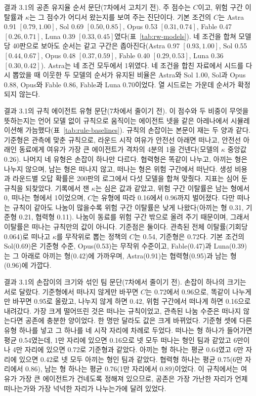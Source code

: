 결과 3.1의 공존 유지율 순서 문단(7차에서 고치기 전).
주 점수는 $C$이고, 위험 구간 이탈률과 $\kappa$는 그 점수가 어디서 왔는지를 보여 주는 진단이다. 기본 조건의 $C$는 Astra 0.91 $[0.79,1.00]$, Sol 0.69 $[0.50,0.85]$, Opus 0.53 $[0.31,0.74]$, Fable 0.47 $[0.26,0.71]$, Luna 0.39 $[0.33,0.45]$였다(표~\ref{tab:rw-models}). 네 조건을 합쳐 모델당 40판으로 보아도 순서는 같고 구간은 좁아진다(Astra 0.97 $[0.93,1.00]$, Sol 0.55 $[0.44,0.67]$, Opus 0.48 $[0.37,0.59]$, Fable 0.40 $[0.29,0.53]$, Luna 0.36 $[0.30,0.42]$). Astra는 네 조건 모두에서 1위였다. 네 조건을 합친 자료에서 시드를 다시 뽑았을 때 이웃한 두 모델의 순서가 유지된 비율은 Astra와 Sol 1.00, Sol과 Opus 0.88, Opus와 Fable 0.86, Fable과 Luna 0.70이었다. 열 시드로는 가운데 순서가 확정되지 않는다.

결과 3.1의 규칙 에이전트 유형 문단(7차에서 줄이기 전).
이 점수와 두 비중이 무엇을 뜻하는지는 언어 모델 없이 규칙으로 움직이는 에이전트 넷을 같은 아레나에서 시뮬레이션해 가늠했다(표~\ref{tab:rule-baselines}). 규칙의 손잡이는 본문이 재는 두 양과 같다. 기준형은 관측에 맞춘 규칙으로, 라운드 시작 여유가 안전선 아래면 떠나고, 안전선 아래인 동료에게 여유가 가장 큰 에이전트가 격차의 4분의 1을 건넨다(모델의 $\kappa$ 중앙값 0.26). 나머지 네 유형은 손잡이 하나만 다르다. 협력형은 똑같이 나누고, 아끼는 형은 나누지 않으며, 남는 형은 떠나지 않고, 떠나는 형은 위험 구간에서 떠난다. 생성 비용과 라운드별 오답 확률은 200판의 로그에서 다섯 모델을 합쳐 맞췄다. 지표는 심어 둔 규칙을 되찾았다. 기록에서 잰 $\kappa$는 심은 값과 같았고, 위험 구간 이탈률은 남는 형에서 0, 떠나는 형에서 1이었으며, $C$는 유형에 따라 0.16에서 0.96까지 벌어졌다. 다만 떠나는 규칙이 같아도 나눔이 많을수록 위험 구간 이탈률은 낮게 나왔다(아끼는 형 0.31, 기준형 0.21, 협력형 0.11). 나눔이 동료를 위험 구간 밖으로 올려 주기 때문이며, 그래서 이탈률은 떠나는 규칙만의 값이 아니다. 기준점은 둘이다. 관측된 전체 이탈률(기회당 0.064)로 떠나고 $\kappa$를 무작위로 뽑는 정책의 $C$는 0.54, 기준형은 0.72다. 기본 조건의 Sol(0.69)은 기준형 수준, Opus(0.53)는 무작위 수준이고, Fable(0.47)과 Luna(0.39)는 그 아래로 아끼는 형(0.42)에 가까우며, Astra(0.91)는 협력형(0.95)과 남는 형(0.96)에 가깝다.

결과 3.1의 손잡이의 크기와 섞인 팀 문단(7차에서 줄이기 전).
손잡이 하나의 크기는 서로 달랐다. 기준형에서 떠나지 않게만 바꾸면 $C$는 0.72에서 0.96으로, 똑같이 나누게만 바꾸면 0.95로 올랐고, 나누지 않게 하면 0.42, 위험 구간에서 떠나게 하면 0.16으로 내려갔다. 가장 크게 떨어뜨린 것은 떠나는 규칙이었고, 관측된 나눔 수준은 떠나지 않는다면 공존에 충분한 양이었다. 한 명만 달라도 값은 크게 바뀌었다. 기준형 셋에 다른 유형 하나를 넣고 그 하나를 네 시작 자리에 차례로 두었다. 떠나는 형 하나가 들어가면 평균 0.54였는데, 1만 자리에 있으면 0.16으로 넷 모두 떠나는 형인 팀과 같았고 6만이나 4만 자리에 있으면 0.72로 기준형과 같았다. 아끼는 형 하나는 평균 0.64였고 6만 자리에 있으면 0.42로 넷 모두 아끼는 형인 팀과 같았다. 협력형 하나는 평균 0.75(6만 자리에서 0.86), 남는 형 하나는 평균 0.76(1만 자리에서 0.89)이었다. 이 규칙에서는 여유가 가장 큰 에이전트가 건네도록 정해져 있으므로, 공존은 가장 가난한 자리가 언제 떠나는가와 가장 넉넉한 자리가 나누는가에 달려 있었다.

